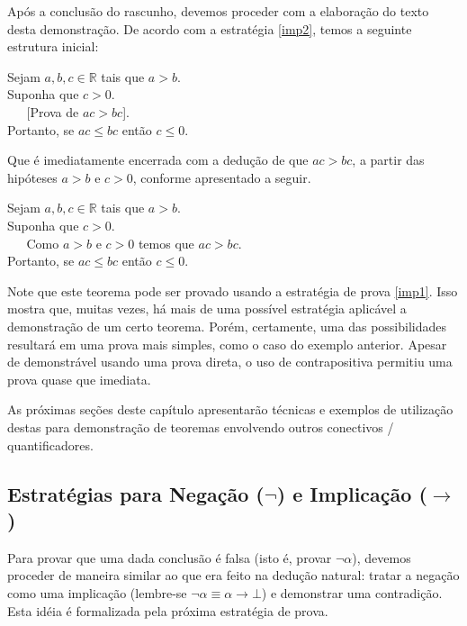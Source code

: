 \begin{Example}
Após a conclusão do rascunho, devemos proceder com a elaboração do
texto desta demonstração. De acordo com a estratégia \ref{imp2}, temos
a seguinte estrutura inicial:
\begin{flushleft}
Sejam $a,b,c \in \mathbb{R}$ tais que $a > b$.\\
Suponha que $c > 0$.\\
\verb|   |[Prova de $ac > bc$].\\
Portanto, se $ac \leq bc$ então $c \leq 0$.
\end{flushleft}
Que é imediatamente encerrada com a dedução de que $ac > bc$, a partir
das hipóteses $a > b$ e $c > 0$, conforme
apresentado a seguir.
\begin{flushleft}
Sejam $a,b,c \in \mathbb{R}$ tais que $a > b$.\\
Suponha que $c > 0$.\\
\verb|   |Como  $a > b$ e $c > 0$ temos que $ac > bc$.\\
Portanto, se $ac \leq bc$ então $c \leq 0$.
\end{flushleft}
\end{Example}

Note que este teorema pode ser provado usando a estratégia de prova
\ref{imp1}. Isso mostra que, muitas vezes, há mais de uma possível
estratégia aplicável a demonstração de um certo teorema. Porém,
certamente, uma das possibilidades resultará em uma prova mais
simples, como o caso do exemplo anterior. Apesar de demonstrável
usando uma prova direta, o uso de contrapositiva permitiu uma prova
quase que imediata.

As próximas seções deste capítulo apresentarão técnicas e exemplos de
utilização destas para demonstração de teoremas envolvendo outros
conectivos / quantificadores.

\subsection{Estratégias para Negação ($\neg$) e Implicação ($\to$)}

Para provar que uma dada conclusão é falsa (isto é, provar $\neg
\alpha$), devemos proceder de maneira similar ao que era feito na
dedução natural: tratar a negação como uma implicação (lembre-se $\neg
\alpha \equiv \alpha\to\bot$) e demonstrar uma contradição. Esta idéia
é formalizada pela próxima estratégia de prova.

